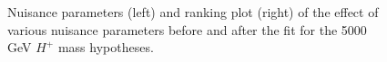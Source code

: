 \begin{figure}[H]
  \centering
  \caption{Nuisance parameters (left) and ranking plot (right) of the effect of various nuisance parameters before and after the fit for the 5000 GeV $H^{+}$ mass hypotheses.}
\end{figure}
